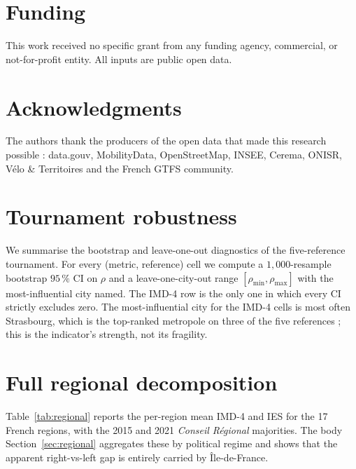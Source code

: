 \documentclass[11pt,a4paper]{article}
\begin{document}
\section*{Funding}
This work received no specific grant from any funding agency,
commercial, or not-for-profit entity.  All inputs are public
open data.

\section*{Acknowledgments}
The authors thank the producers of the open data that made this
research possible : data.gouv, MobilityData, OpenStreetMap, INSEE,
Cerema, ONISR, V\'elo \& Territoires and the French GTFS
community.

\appendix

\section{Tournament robustness}
\label{app:robust}

We summarise the bootstrap and leave-one-out diagnostics of the
five-reference tournament.  For every (metric, reference) cell we
compute a $1{,}000$-resample bootstrap $95\,\%$ CI on $\rho$ and a
leave-one-city-out range $[\rho_{\min}, \rho_{\max}]$ with the
most-influential city named.  The IMD-4 row is the only one in
which every CI strictly excludes zero.  The most-influential
city for the IMD-4 cells is most often Strasbourg, which is the
top-ranked metropole on three of the five references ; this is
the indicator's strength, not its fragility.

\section{Full regional decomposition}
\label{app:regional-full}

Table~\ref{tab:regional} reports the per-region mean IMD-4 and IES
for the 17 French regions, with the 2015 and 2021 \emph{Conseil
R\'egional} majorities.  The body Section~\ref{sec:regional}
aggregates these by political regime and shows that the apparent
right-vs-left gap is entirely carried by \^Ile-de-France.
\end{document}
